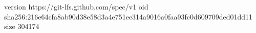 version https://git-lfs.github.com/spec/v1
oid sha256:216e64cfa8ab90d38e58d3a4e751ee314a9016a0faa93fc0d609709ded01dd11
size 304174
